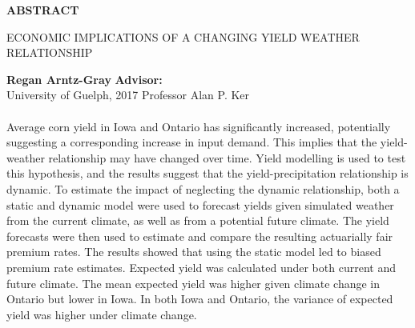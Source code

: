 \thispagestyle{empty}
\begin{center}
\Large
\textbf{\uppercase{Abstract}}
\end{center}
\medskip
\begin{center}
\large
\singlespacing
\uppercase{Economic Implications of a Changing Yield Weather Relationship }
\end{center}
\bigskip
\noindent
\textbf{Regan Arntz-Gray}
\hfill
\textbf{Advisor:\hspace{23mm}} \\
University of Guelph, 2017
\hfill
Professor Alan P. Ker
\bigskip
\\
\\
Average corn yield in Iowa and Ontario has significantly increased, potentially suggesting a corresponding increase in input demand. This implies that the yield-weather relationship may have changed over time. Yield modelling is used to test this hypothesis, and the results suggest that the yield-precipitation relationship is dynamic. To estimate the impact of neglecting the dynamic relationship, both a static and dynamic model were used to forecast yields given simulated weather from the current climate, as well as from a potential future climate. The yield forecasts were then used to estimate and compare the resulting actuarially fair premium rates. The results showed that using the static model led to biased premium rate estimates. Expected yield was calculated under both current and future climate. The mean expected yield was higher given climate change in Ontario but lower in Iowa. In both Iowa and Ontario, the variance of expected yield was higher under climate change.

\pagebreak



